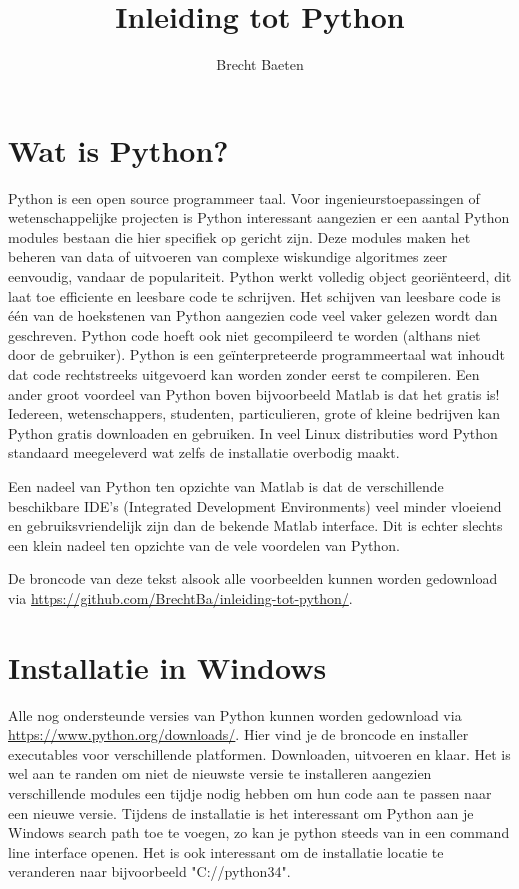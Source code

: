 \documentclass[11pt,twoside]{article}
\title{Inleiding tot Python}
\author{Brecht Baeten}
\begin{document}
	\maketitle

	\section{Wat is Python?}
Python is een open source programmeer taal. Voor ingenieurstoepassingen of wetenschappelijke projecten is Python interessant aangezien er een aantal Python modules bestaan die hier specifiek op gericht zijn. Deze modules maken het beheren van data of uitvoeren van complexe wiskundige algoritmes zeer eenvoudig, vandaar de populariteit. Python werkt volledig object georiënteerd, dit laat toe efficiente en leesbare code te schrijven. Het schijven van leesbare code is één van de hoekstenen van Python aangezien code veel vaker gelezen wordt dan geschreven. Python code hoeft ook niet gecompileerd te worden (althans niet door de gebruiker). Python is een geïnterpreteerde programmeertaal wat inhoudt dat code rechtstreeks uitgevoerd kan worden zonder eerst te compileren. Een ander groot voordeel van Python boven bijvoorbeeld Matlab is dat het gratis is! Iedereen, wetenschappers, studenten, particulieren, grote of kleine bedrijven kan Python gratis downloaden en gebruiken. In veel Linux distributies word Python standaard meegeleverd wat zelfs de installatie overbodig maakt.

Een nadeel van Python ten opzichte van Matlab is dat de verschillende beschikbare IDE's (Integrated Development Environments) veel minder vloeiend en gebruiksvriendelijk zijn dan de bekende Matlab interface. Dit is echter slechts een klein nadeel ten opzichte van de vele voordelen van Python.

De broncode van deze tekst alsook alle voorbeelden kunnen worden gedownload via \url{https://github.com/BrechtBa/inleiding-tot-python/}.

	\section{Installatie in Windows}
Alle nog ondersteunde versies van Python kunnen worden gedownload via \url{https://www.python.org/downloads/}. Hier vind je de broncode en installer executables voor verschillende platformen. Downloaden, uitvoeren en klaar. Het is wel aan te randen om niet de nieuwste versie te installeren aangezien verschillende modules een tijdje nodig hebben om hun code aan te passen naar een nieuwe versie. Tijdens de installatie is het interessant om Python aan je Windows search path toe te voegen, zo kan je python steeds van in een command line interface openen. Het is ook interessant om de installatie locatie te veranderen naar bijvoorbeeld  "\textsf{C://python34}".
\end{document}
